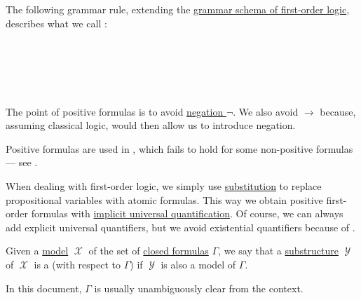 \begin{definition}\label{def:positive_formula}
  The following grammar rule, extending the \hyperref[def:first_order_syntax/grammar_schema]{grammar schema of first-order logic}, describes what we call :
  \begin{bnf*}
     {\bnftsq{\( \top \)} \bnfor} \\
     \\
     \\
     \\
  \end{bnf*}
\end{definition}
\begin{comments}
  \item The point of positive formulas is to avoid \hyperref[def:propositional_language/negation]{negation \( \neg \)}. We also avoid \( \rightarrow \) because, assuming classical logic,  would then allow us to introduce negation.

  \item Positive formulas are used in , which fails to hold for some non-positive formulas --- see .

  \item When dealing with first-order logic, we simply use \hyperref[thm:first_order_substitution_equivalence/propositional]{substitution} to replace propositional variables with atomic formulas. This way we obtain positive first-order formulas with \hyperref[thm:implicit_universal_quantification]{implicit universal quantification}. Of course, we can always add explicit universal quantifiers, but we avoid existential quantifiers because of .
\end{comments}

\begin{definition}\label{def:first_order_submodel}
  Given a \hyperref[def:first_order_model]{model} \( \mscrX \) of the set of \hyperref[def:first_order_syntax/closed_formula]{closed formulas} \( \Gamma \), we say that a \hyperref[def:first_order_substructure]{substructure} \( \mscrY \) of \( \mscrX \) is a  (with respect to \( \Gamma \)) if \( \mscrY \) is also a model of \( \Gamma \).
\end{definition}
\begin{comments}
  \item In this document, \( \Gamma \) is usually unambiguously clear from the context.
\end{comments}

